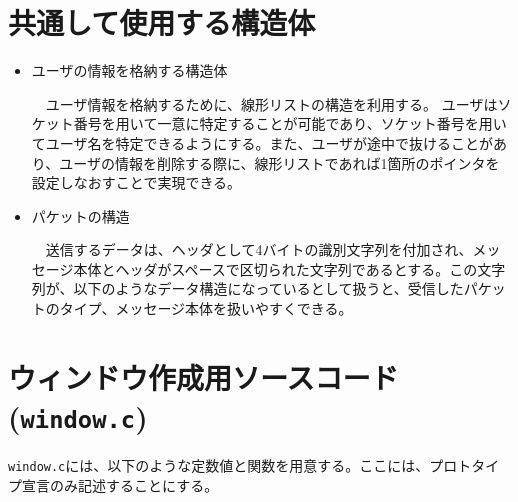 \documentclass[uplatex,dvipdfmx,11pt,a4paper]{jsarticle} %
\begin{document}
\section{共通して使用する構造体}
\begin{itemize}
    \item ユーザの情報を格納する構造体

        　ユーザ情報を格納するために、線形リストの構造を利用する。
        ユーザはソケット番号を用いて一意に特定することが可能であり、ソケット番号を用いてユーザ名を特定できるようにする。また、ユーザが途中で抜けることがあり、ユーザの情報を削除する際に、線形リストであれば1箇所のポインタを設定しなおすことで実現できる。
    

    \item パケットの構造

        　送信するデータは、ヘッダとして4バイトの識別文字列を付加され、メッセージ本体とヘッダがスペースで区切られた文字列であるとする。この文字列が、以下のようなデータ構造になっているとして扱うと、受信したパケットのタイプ、メッセージ本体を扱いやすくできる。
    
\end{itemize}

\section{ウィンドウ作成用ソースコード({\tt window.c})}
{\tt window.c}には、以下のような定数値と関数を用意する。ここには、プロトタイプ宣言のみ記述することにする。
    
\end{document}
